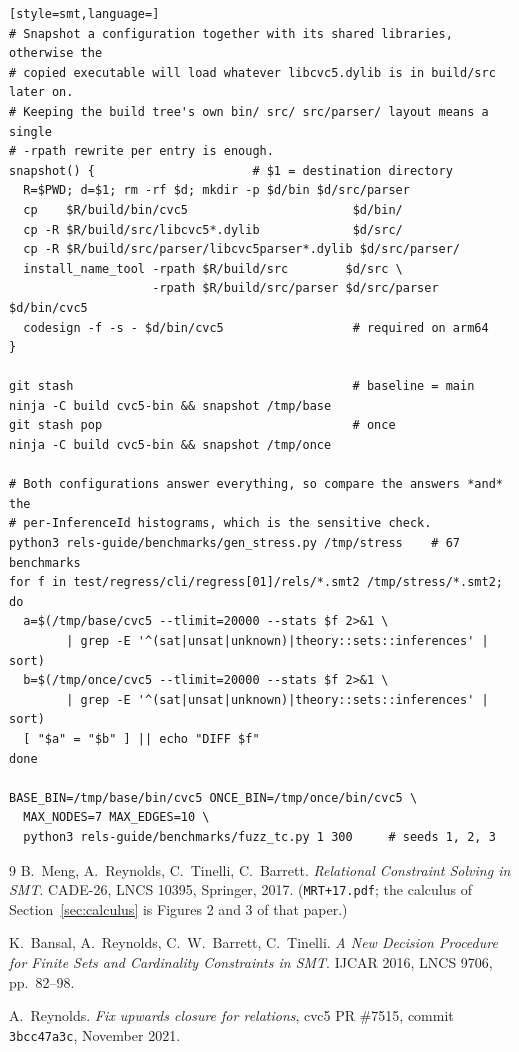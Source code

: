 \documentclass[11pt,a4paper]{article}
\newcommand{\code}[1]{\texttt{\small #1}}
\newcommand{\file}[1]{\texttt{\small #1}}
\theoremstyle{definition}
\begin{document}
\begin{lstlisting}[style=smt,language=]
# Snapshot a configuration together with its shared libraries, otherwise the
# copied executable will load whatever libcvc5.dylib is in build/src later on.
# Keeping the build tree's own bin/ src/ src/parser/ layout means a single
# -rpath rewrite per entry is enough.
snapshot() {                      # $1 = destination directory
  R=$PWD; d=$1; rm -rf $d; mkdir -p $d/bin $d/src/parser
  cp    $R/build/bin/cvc5                       $d/bin/
  cp -R $R/build/src/libcvc5*.dylib             $d/src/
  cp -R $R/build/src/parser/libcvc5parser*.dylib $d/src/parser/
  install_name_tool -rpath $R/build/src        $d/src \
                    -rpath $R/build/src/parser $d/src/parser $d/bin/cvc5
  codesign -f -s - $d/bin/cvc5                  # required on arm64
}

git stash                                       # baseline = main
ninja -C build cvc5-bin && snapshot /tmp/base
git stash pop                                   # once
ninja -C build cvc5-bin && snapshot /tmp/once

# Both configurations answer everything, so compare the answers *and* the
# per-InferenceId histograms, which is the sensitive check.
python3 rels-guide/benchmarks/gen_stress.py /tmp/stress    # 67 benchmarks
for f in test/regress/cli/regress[01]/rels/*.smt2 /tmp/stress/*.smt2; do
  a=$(/tmp/base/cvc5 --tlimit=20000 --stats $f 2>&1 \
        | grep -E '^(sat|unsat|unknown)|theory::sets::inferences' | sort)
  b=$(/tmp/once/cvc5 --tlimit=20000 --stats $f 2>&1 \
        | grep -E '^(sat|unsat|unknown)|theory::sets::inferences' | sort)
  [ "$a" = "$b" ] || echo "DIFF $f"
done

BASE_BIN=/tmp/base/bin/cvc5 ONCE_BIN=/tmp/once/bin/cvc5 \
  MAX_NODES=7 MAX_EDGES=10 \
  python3 rels-guide/benchmarks/fuzz_tc.py 1 300     # seeds 1, 2, 3
\end{lstlisting}

\begin{thebibliography}{9}
\bibitem{MRT17}
B.~Meng, A.~Reynolds, C.~Tinelli, C.~Barrett.
\newblock \emph{Relational Constraint Solving in SMT}.
\newblock CADE-26, LNCS 10395, Springer, 2017.
\newblock (\file{MRT+17.pdf}; the calculus of Section~\ref{sec:calculus} is
Figures 2 and 3 of that paper.)

\bibitem{Bansal16}
K.~Bansal, A.~Reynolds, C.~W.~Barrett, C.~Tinelli.
\newblock \emph{A New Decision Procedure for Finite Sets and Cardinality
Constraints in SMT}.
\newblock IJCAR 2016, LNCS 9706, pp.~82--98.

\bibitem{PR7515}
A.~Reynolds. \emph{Fix upwards closure for relations}, cvc5 PR \#7515,
commit \code{3bcc47a3c}, November 2021.
\end{thebibliography}
\end{document}
